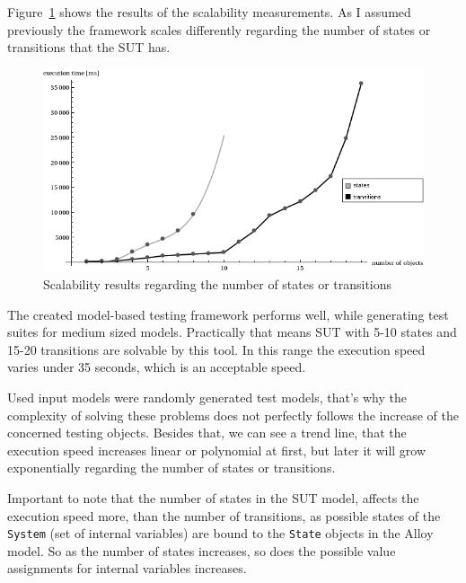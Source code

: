 Figure~\ref{fig:measurements_scalability} shows the results of the scalability measurements. As I assumed previously the framework scales differently regarding the number of states or transitions that the SUT has.

\begin{figure}[htp]
\centering
\includegraphics[scale=0.5]{figures/measurements_scalability}
\caption{Scalability results regarding the number of states or transitions}
\label{fig:measurements_scalability}
\end{figure}

The created model-based testing framework performs well, while generating test suites for medium sized models. Practically that means SUT with 5-10 states and 15-20 transitions are solvable by this tool. In this range the execution speed varies under 35 seconds, which is an acceptable speed.

Used input models were randomly generated test models, that's why the complexity of solving these problems does not perfectly follows the increase of the concerned testing objects. Besides that, we can see a trend line, that the execution speed increases linear or polynomial at first, but later it will grow exponentially regarding the number of states or transitions.

Important to note that the number of states in the SUT model, affects the execution speed more, than the number of transitions, as possible states of the \texttt{System} (set of internal variables) are bound to the \texttt{State} objects in the Alloy model. So as the number of states increases, so does the possible value assignments for internal variables increases.


